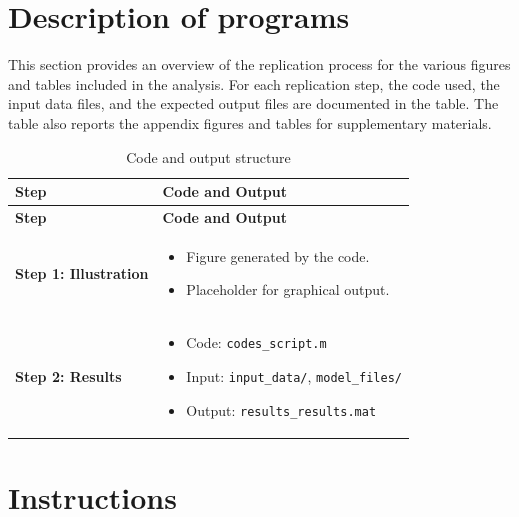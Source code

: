\documentclass{article}
\begin{document}
	
	\section{Description of programs}
	
	This section provides an overview of the replication process for the various figures and tables included in the analysis. For each replication step, the code used, the input data files, and the expected output files are documented in the table. The table also reports the appendix figures and tables for supplementary materials.%
	
	
\begin{longtable}
	{>{\raggedright\arraybackslash}p{} @{ } >{\raggedright\arraybackslash}p{} @{}} 
	\caption{Code and output structure} \\
	\hline
	\hline
	\textbf{Step} & \textbf{Code and Output} \\
	\hline
	\endfirsthead
	\hline
	\textbf{Step} & \textbf{Code and Output} \\
	\hline
	\endhead
	\hline
	\endlastfoot
	
	\textbf{Step 1: Illustration} & 
	\begin{itemize}
		\item Figure generated by the code.
		\item Placeholder for graphical output.
	\end{itemize}
	\\
	\hline
	
	\textbf{Step 2: Results} & 
	\begin{itemize}
		\item Code: \texttt{codes\_script.m}
		\item Input: \texttt{input\_data/}, \texttt{model\_files/}
		\item Output: \texttt{results\_results.mat}
	\end{itemize}
	\\
	\hline
	
\end{longtable}
	
	\section{Instructions}
	
\end{document}
